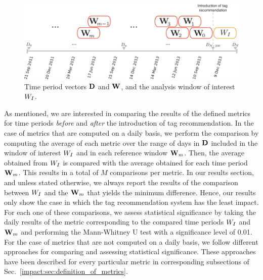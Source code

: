 \begin{figure}
\centerline{\includegraphics[width=1.0\columnwidth]{ch05_impact/pics/fig04_analysis_windows}}
\caption[Time period vectors and analysis windows]{Time period vectors $\mathbf{D}$ and $\mathbf{W}$, and the analysis window of interest $W_I$.}
\label{impact:fig:analysis_windows}
\end{figure}

As mentioned, we are interested in comparing the results of the defined metrics for time periods \emph{before} and \emph{after} the introduction of tag recommendation. In the case of metrics that are computed on a daily basis, we perform the comparison by computing the average of each metric over the range of days in $\mathbf{\mathbf{D}}$ included in the window of interest $W_I$ and in each reference window $\mathbf{W}_{m}$. Then, the average obtained from $W_I$ is compared with the average obtained for each time period $\mathbf{W}_{m}$. This results in a total of $M$ comparisons per metric. In our results section, and unless stated otherwise, we always report the results of the comparison between $W_I$ and the $\mathbf{W}_{m}$ that yields the minimum difference. Hence, our results only show the case in which the tag recommendation system has the least impact. For each one of these comparisons, we assess statistical significance by taking the daily results of the metric corresponding to the compared time periods $W_I$ and $\mathbf{W}_{m}$ and performing the Mann-Whitney U test with a significance level of 0.01. For the case of metrics that are not computed on a daily basis, we follow different approaches for comparing and assessing statistical significance. These approaches  have been described for every particular metric in corresponding subsections of Sec.~\ref{impact:sec:definition_of_metrics}.

